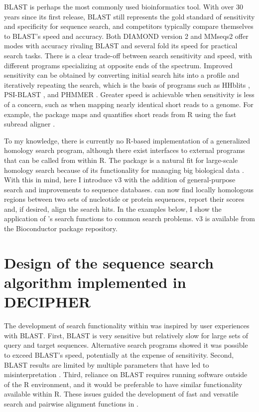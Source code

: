 BLAST is perhaps the most commonly used bioinformatics tool. With over 30 years since its first release, BLAST still represents the gold standard of sensitivity and specificity for sequence search, and competitors typically compare themselves to BLAST's speed and accuracy. Both DIAMOND version 2 and MMseqs2 offer modes with accuracy rivaling BLAST and several fold its speed for practical search tasks. There is a clear trade-off between search sensitivity and speed, with different programs specializing at opposite ends of the spectrum. Improved sensitivity can be obtained by converting initial search hits into a profile and iteratively repeating the search, which is the basis of programs such as HHblits \citep{RN4231}, PSI-BLAST \citep{RN36}, and PHMMER \citep{RN3488}. Greater speed is achievable when sensitivity is less of a concern, such as when mapping nearly identical short reads to a genome. For example, the  package maps and quantifies short reads from R using the fast subread aligner \citep{RN4279}.

To my knowledge, there is currently no R-based implementation of a generalized homology search program, although there exist interfaces to external programs that can be called from within R. The  package is a natural fit for large-scale homology search because of its functionality for managing big biological data \citep{RN2700}. With this in mind, here I introduce  v3 with the addition of general-purpose search and improvements to sequence databases.  can now find locally homologous regions between two sets of nucleotide or protein sequences, report their scores and, if desired, align the search hits. In the examples below, I show the application of 's search functions to common search problems.  v3 is available from the Bioconductor package repository.

\section{Design of the sequence search algorithm implemented in DECIPHER}\label{design-of-the-sequence-search-algorithm-implemented-in-decipher}

The development of search functionality within  was inspired by user experiences with BLAST. First, BLAST is very sensitive but relatively slow for large sets of query and target sequences. Alternative search programs showed it was possible to exceed BLAST's speed, potentially at the expense of sensitivity. Second, BLAST results are limited by multiple parameters that have led to misinterpretation \citep{RN4237,RN4225,RN4259}. Third, reliance on BLAST requires running software outside of the R environment, and it would be preferable to have similar functionality available within R. These issues guided the development of fast and versatile search and pairwise alignment functions in .

